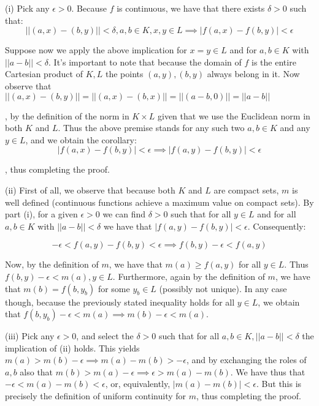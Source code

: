 \begin{solution}

    (i) Pick any $\epsilon > 0$. Because $f$ is continuous, we have that there exists $\delta > 0$ such that:
    $$\lvert \lvert (a, x) - (b, y) \rvert \rvert < \delta, a, b \in K, x, y \in L \implies \lvert f(a, x) - f(b, y) \rvert < \epsilon$$

    Suppose now we apply the above implication for $x = y \in L$ and for $a, b \in K$ with $\lvert \lvert a - b \rvert \rvert < \delta$. It's important to note that because the domain of $f$ is the entire Cartesian product of $K, L$ the points $(a, y), (b, y)$ always belong in it. Now observe that $\lvert \lvert (a, x) - (b, y) \rvert \rvert = \lvert \lvert (a, x) - (b, x) \rvert \rvert = \lvert \lvert (a - b, 0) \rvert \rvert = \lvert \lvert a - b \rvert \rvert$

    , by the definition of the norm in $K \times L$ given that we use the Euclidean norm in both $K$ and $L$. Thus the above premise stands for any such two $a, b \in K$ and any $y \in L$, and we obtain the corollary:
    $$\lvert f(a, x) - f(b, y) \rvert < \epsilon \implies \lvert f(a, y) - f(b, y) \rvert < \epsilon$$

    , thus completing the proof.

    (ii) First of all, we observe that because both $K$ and $L$ are compact sets, $m$ is well defined (continuous functions achieve a maximum value on compact sets). By part (i), for a given $\epsilon > 0$ we can find $\delta > 0$ such that for all $y \in L$ and for all $a, b \in K$ with $\lvert \lvert a - b \rvert \rvert < \delta$ we have that $\lvert f(a, y) - f(b, y) \rvert < \epsilon$. Consequently:

    $$- \epsilon < f(a, y) - f(b, y) < \epsilon \implies f(b, y) - \epsilon < f(a, y)$$

    Now, by the definition of $m$, we have that $m(a) \geq f(a, y)$ for all $y \in L$. Thus $f(b, y) - \epsilon < m(a), y \in L$. Furthermore, again by the definition of $m$, we have that $m(b) = f(b, y_b)$ for some $y_b \in L$ (possibly not unique). In any case though, because the previously stated inequality holds for all $y \in L$, we obtain that $f(b, y_b) - \epsilon < m(a) \implies m(b) - \epsilon < m(a)$.

    (iii) Pick any $\epsilon > 0$, and select the $\delta > 0$ such that for all $a, b \in K, \lvert \lvert a - b \rvert \rvert < \delta$ the implication of (ii) holds. This yields $m(a) > m(b) - \epsilon \implies m(a) - m(b) > -\epsilon$, and by exchanging the roles of $a, b$ also that $m(b) > m(a) - \epsilon \implies \epsilon > m(a) - m(b)$. We have thus that $-\epsilon < m(a) - m(b) < \epsilon$, or, equivalently, $\lvert m(a) - m(b) \rvert < \epsilon$. But this is precisely the definition of uniform continuity for $m$, thus completing the proof.


\end{solution}
